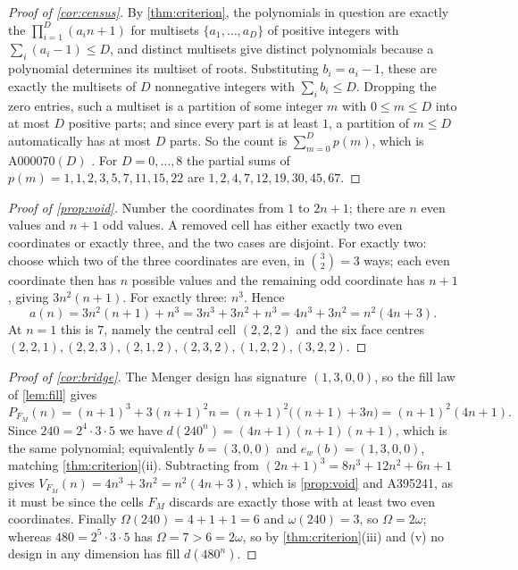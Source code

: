 \documentclass[11pt]{amsart}
\theoremstyle{definition}
\theoremstyle{remark}
\begin{document}
\begin{proof}[Proof of \cref{cor:census}]
By \cref{thm:criterion}, the polynomials in question are exactly the $\prod_{i=1}^{D}(a_{i}n+1)$ for multisets $\{a_{1},\dots,a_{D}\}$ of positive integers with $\sum_{i}(a_{i}-1) \le D$, and distinct multisets give distinct polynomials because a polynomial determines its multiset of roots. Substituting $b_{i}=a_{i}-1$, these are exactly the multisets of $D$ nonnegative integers with $\sum_{i}b_{i} \le D$. Dropping the zero entries, such a multiset is a partition of some integer $m$ with $0 \le m \le D$ into at most $D$ positive parts; and since every part is at least $1$, a partition of $m \le D$ automatically has at most $D$ parts. So the count is $\sum_{m=0}^{D}p(m)$, which is A000070$(D)$ \cite{a000070}. For $D=0,\dots,8$ the partial sums of $p(m)=1,1,2,3,5,7,11,15,22$ are $1,2,4,7,12,19,30,45,67$.
\end{proof}

\begin{proof}[Proof of \cref{prop:void}]
Number the coordinates from $1$ to $2n+1$; there are $n$ even values and $n+1$ odd values. A removed cell has either exactly two even coordinates or exactly three, and the two cases are disjoint. For exactly two: choose which two of the three coordinates are even, in $\binom{3}{2}=3$ ways; each even coordinate then has $n$ possible values and the remaining odd coordinate has $n+1$, giving $3n^{2}(n+1)$. For exactly three: $n^{3}$. Hence
\[
  a(n) = 3n^{2}(n+1) + n^{3} = 3n^{3}+3n^{2}+n^{3} = 4n^{3}+3n^{2} = n^{2}(4n+3).
\]
At $n=1$ this is $7$, namely the central cell $(2,2,2)$ and the six face centres $(2,2,1),(2,2,3),(2,1,2),(2,3,2),(1,2,2),(3,2,2)$.
\end{proof}

\begin{proof}[Proof of \cref{cor:bridge}]
The Menger design has signature $(1,3,0,0)$, so the fill law of \cref{lem:fill} gives
\[
  P_{F_{M}}(n) = (n+1)^{3} + 3(n+1)^{2}n = (n+1)^{2}\bigl((n+1)+3n\bigr) = (n+1)^{2}(4n+1).
\]
Since $240 = 2^{4}\cdot 3\cdot 5$ we have $d(240^{n}) = (4n+1)(n+1)(n+1)$, which is the same polynomial; equivalently $b=(3,0,0)$ and $e_{w}(b)=(1,3,0,0)$, matching \cref{thm:criterion}(ii). Subtracting from $(2n+1)^{3}=8n^{3}+12n^{2}+6n+1$ gives $V_{F_{M}}(n)=4n^{3}+3n^{2}=n^{2}(4n+3)$, which is \cref{prop:void} and A395241, as it must be since the cells $F_{M}$ discards are exactly those with at least two even coordinates. Finally $\Omega(240)=4+1+1=6$ and $\omega(240)=3$, so $\Omega=2\omega$; whereas $480=2^{5}\cdot 3\cdot 5$ has $\Omega=7>6=2\omega$, so by \cref{thm:criterion}(iii) and (v) no design in any dimension has fill $d(480^{n})$.
\end{proof}
\end{document}
